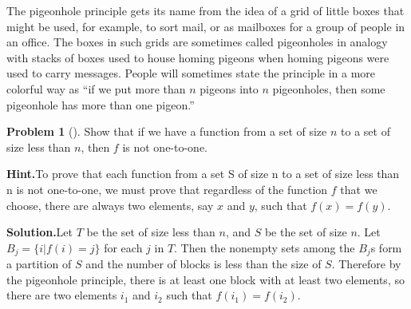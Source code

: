 \documentclass[10pt,]{book}
\theoremstyle{plain}
\theoremstyle{definition}
\newtheorem{activity}[project]{Problem}
\theoremstyle{definition}
\numberwithin{equation}{chapter}
\begin{document}
The pigeonhole principle gets its name from the idea of a grid of little boxes that might be used, for example, to sort mail, or as mailboxes for a group of people in an office. The boxes in such grids are sometimes called pigeonholes in analogy with stacks of boxes used to house homing pigeons when homing pigeons were used to carry messages. People will sometimes state the principle in a more colorful way as ``if we put more than \(n\) pigeons into \(n\) pigeonholes, then some pigeonhole has more than one pigeon.''%
\begin{activity}[]\label{activity-61}
Show that if we have a function from a set of size \(n\) to a set of size less than \(n\), then \(f\) is not one-to-one.%
\par\medskip\noindent%
\textbf{Hint.}\quad To prove that each function from a set S of size n to a set of size less than n is not one-to-one, we must prove that regardless of the function \(f\) that we choose, there are always two elements, say \(x\) and \(y\), such that \(f(x) = f(y)\).%
\par\medskip\noindent%
\textbf{Solution.}\quad Let \(T\) be the set of size less than \(n\), and \(S\) be the set of size \(n\). Let \(B_j=\{i|f(i)=j\}\) for each \(j\) in \(T\). Then the nonempty sets among the \(B_j\)s form a partition of \(S\) and the number of blocks is less than the size of \(S\). Therefore by the pigeonhole principle, there is at least one block with at least two elements, so there are two elements \(i_1\) and \(i_2\) such that \(f(i_1)=f(i_2)\).%
\end{activity}
\end{document}
